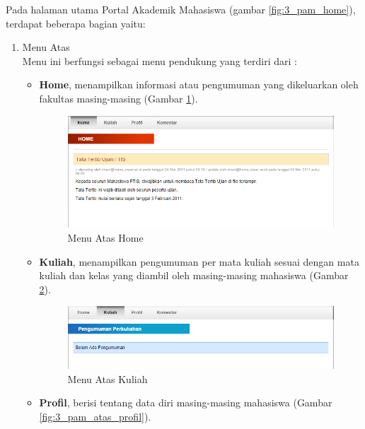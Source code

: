 \documentclass[a4paper,twoside]{article}
\begin{document}
\begin{enumerate}
\begin{enumerate}
Pada halaman utama Portal Akademik Mahasiswa (gambar \ref{fig:3_pam_home}), terdapat beberapa bagian yaitu:
\begin{enumerate}
	\item Menu Atas\\
	Menu ini berfungsi sebagai menu pendukung yang terdiri dari : 
	\begin{itemize}
		\item \textbf{Home}, menampilkan informasi atau pengumuman yang dikeluarkan oleh fakultas masing-masing (Gambar \ref{fig:3_pam_atas_home}). 
		
		\begin{figure}[H]
			\centering
			\includegraphics[scale=0.5]{Gambar/pam-atas-home}
			\caption{Menu Atas Home} 
			\label{fig:3_pam_atas_home}
		\end{figure}
		
		\item \textbf{Kuliah}, menampilkan pengumuman per mata kuliah sesuai dengan mata kuliah dan kelas yang diambil oleh masing-masing mahasiswa (Gambar \ref{fig:3_pam_atas_kuliah}).  
		
		\begin{figure}[H]
			\centering
			\includegraphics[scale=0.5]{Gambar/pam-atas-kuliah}
			\caption{Menu Atas Kuliah} 
			\label{fig:3_pam_atas_kuliah}
		\end{figure}
		
		\item \textbf{Profil}, berisi tentang data diri masing-masing mahasiswa (Gambar \ref{fig:3_pam_atas_profil}). 
		

\end{itemize}
\end{enumerate}
\end{enumerate}
\end{enumerate}
\end{document}
